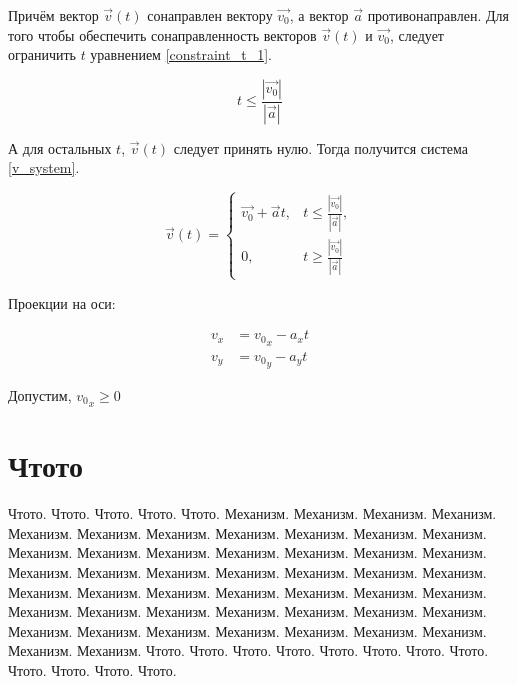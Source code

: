 Причём вектор \(\vec{v}(t)\) сонаправлен вектору \(\vec{v_0}\), а вектор \(\vec{a}\) противонаправлен.
Для того чтобы обеспечить сонаправленность векторов \(\vec{v}(t)\) и \(\vec{v_0}\), следует ограничить \(t\)
уравнением \ref{constraint_t_1}.

\begin{equation}\label{constraint_t_1}
  t \leqslant \frac{\left|\vec{v_0}\right|}{\left|\vec{a}\right|}
\end{equation}

А для остальных \(t\), \(\vec{v}(t)\) следует принять нулю. Тогда получится система \ref{v_system}.

\begin{equation}\label{v_system}
  \vec{v}(t) = \begin{cases}
    \vec{v_0} + \vec{a}t, & t \leqslant \frac{\left|\vec{v_0}\right|}{\left|\vec{a}\right|}, \\
    0,                    & t \geqslant \frac{\left|\vec{v_0}\right|}{\left|\vec{a}\right|}
  \end{cases}
\end{equation}

Проекции на оси:

\begin{align*}
  v_x & = {v_0}_x - a_x t \\
  v_y & = {v_0}_y - a_y t
\end{align*}

Допустим, \({v_0}_x \geqslant 0\)

\section{Чтото}

Чтото.
Чтото.
Чтото.
Чтото.
Чтото.  Механизм. Механизм. Механизм. Механизм. Механизм.
Механизм. Механизм. Механизм. Механизм. Механизм. Механизм. Механизм. Механизм.
Механизм. Механизм. Механизм. Механизм. Механизм. Механизм. Механизм. Механизм.
Механизм. Механизм. Механизм. Механизм. Механизм. Механизм. Механизм. Механизм.
Механизм. Механизм. Механизм. Механизм. Механизм. Механизм. Механизм. Механизм.
Механизм. Механизм. Механизм. Механизм. Механизм. Механизм. Механизм. Механизм.
Механизм. Механизм. Механизм.
Чтото.
Чтото.
Чтото.
Чтото.
Чтото.
Чтото.
Чтото.
Чтото.
Чтото.
Чтото.
Чтото.
Чтото.